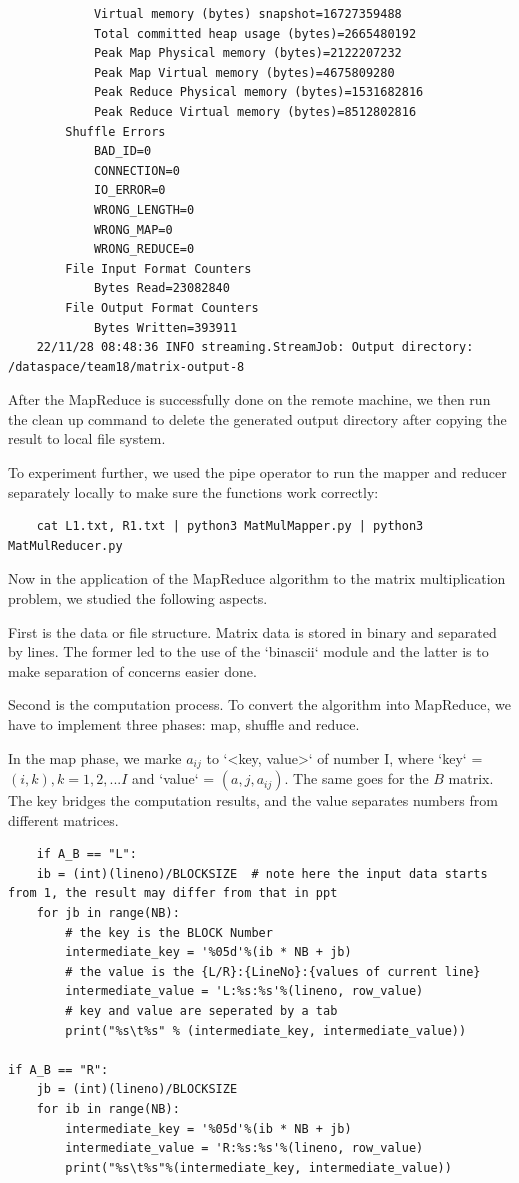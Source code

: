\begin{lstlisting}
            Virtual memory (bytes) snapshot=16727359488
            Total committed heap usage (bytes)=2665480192
            Peak Map Physical memory (bytes)=2122207232
            Peak Map Virtual memory (bytes)=4675809280
            Peak Reduce Physical memory (bytes)=1531682816
            Peak Reduce Virtual memory (bytes)=8512802816
        Shuffle Errors
            BAD_ID=0
            CONNECTION=0
            IO_ERROR=0
            WRONG_LENGTH=0
            WRONG_MAP=0
            WRONG_REDUCE=0
        File Input Format Counters
            Bytes Read=23082840
        File Output Format Counters
            Bytes Written=393911
    22/11/28 08:48:36 INFO streaming.StreamJob: Output directory: /dataspace/team18/matrix-output-8
\end{lstlisting}

After the MapReduce is successfully done on the remote machine, we then run the clean up command to delete the generated output directory after copying the result to local file system. 

To experiment further, we used the pipe operator to run the mapper and reducer separately locally to make sure the functions work correctly: 

\lstset{language=C++}
\begin{lstlisting}
    cat L1.txt, R1.txt | python3 MatMulMapper.py | python3 MatMulReducer.py
\end{lstlisting}

Now in the application of the MapReduce algorithm to the matrix multiplication problem, we studied the following aspects. 

First is the data or file structure. Matrix data is stored in binary and separated by lines. The former led to the use of the `binascii` module and the latter is to make separation of concerns easier done. 

Second is the computation process. To convert the algorithm into MapReduce, we have to implement three phases: map, shuffle and reduce. 

In the map phase, we marke $a_{ij}$ to `<key, value>` of number I, where `key` = $(i,k), k =1,2,...I$ and `value` = $(a, j, a_{ij}).$ The same goes for the $B$ matrix. The key bridges the computation results, and the value separates numbers from different matrices. 

\lstset{language=Python}
\begin{lstlisting}
    if A_B == "L":
    ib = (int)(lineno)/BLOCKSIZE  # note here the input data starts from 1, the result may differ from that in ppt
    for jb in range(NB):
        # the key is the BLOCK Number
        intermediate_key = '%05d'%(ib * NB + jb)
        # the value is the {L/R}:{LineNo}:{values of current line}
        intermediate_value = 'L:%s:%s'%(lineno, row_value)
        # key and value are seperated by a tab
        print("%s\t%s" % (intermediate_key, intermediate_value))

if A_B == "R":
    jb = (int)(lineno)/BLOCKSIZE
    for ib in range(NB):
        intermediate_key = '%05d'%(ib * NB + jb)
        intermediate_value = 'R:%s:%s'%(lineno, row_value)
        print("%s\t%s"%(intermediate_key, intermediate_value))
\end{lstlisting}

